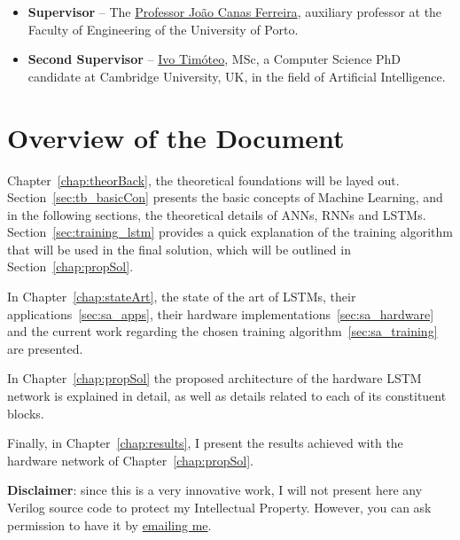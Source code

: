 \begin{itemize}
    \item \textbf{Supervisor} -- The \href{https://sigarra.up.pt/feup/pt/func\_geral.formview?p\_codigo=210963}{Professor João Canas Ferreira}, auxiliary professor at the Faculty of Engineering of the University of Porto.
    \item \textbf{Second Supervisor} -- \href{http://www.cl.cam.ac.uk/~ijpdmt2/}{Ivo Timóteo}, MSc, a Computer Science PhD candidate at Cambridge University, UK, in the field of Artificial Intelligence.
\end{itemize}

\section{Overview of the Document}\label{sec:intro_overview}
Chapter~\ref{chap:theorBack}, the theoretical foundations will be layed out. Section~\ref{sec:tb_basicCon} presents the basic concepts of Machine Learning, and in the following sections, the theoretical details of ANNs, RNNs and LSTMs. Section~\ref{sec:training_lstm} provides a quick explanation of the training algorithm that will be used in the final solution, which will be outlined in Section~\ref{chap:propSol}.

In Chapter~\ref{chap:stateArt}, the state of the art of LSTMs, their applications~\ref{sec:sa_apps}, their hardware implementations~\ref{sec:sa_hardware} and the current work regarding the chosen training algorithm~\ref{sec:sa_training} are presented.

In Chapter~\ref{chap:propSol} the proposed architecture of the hardware LSTM network is explained in detail, as well as details related to each of its constituent blocks.

Finally, in Chapter~\ref{chap:results}, I present the results achieved with the hardware network of Chapter~\ref{chap:propSol}.

\textbf{Disclaimer}: since this is a very innovative work, I will not present here any Verilog source code to protect my Intellectual Property. However, you can ask permission to have it by \href{mailto:ee11126@fe.up.pt}{emailing me}.
